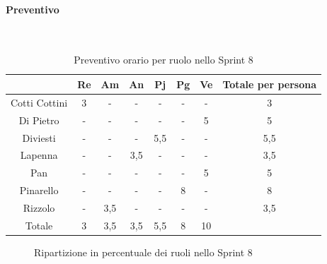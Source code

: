 \documentclass{article}
\begin{document}
                \paragraph{Preventivo}\mbox{}\\
                \begin{table}[H]
                    \centering
                    \begin{tabular}{|c|c|c|c|c|c|c|c|}
                    \hline
                                  & Re  & Am  & An  & Pj  & Pg  & Ve  & Totale per persona \\ \hline
                    Cotti Cottini & 3   & -   & -   & -   & -   & -   & 3                  \\ \hline
                    Di Pietro     & -   & -   & -   & -   & -   & 5   & 5                  \\ \hline
                    Diviesti      & -   & -   & -   & 5,5 & -   & -   & 5,5                \\ \hline
                    Lapenna       & -   & -   & 3,5 & -   & -   & -   & 3,5                \\ \hline
                    Pan           & -   & -   & -   & -   & -   & 5   & 5                  \\ \hline
                    Pinarello     & -   & -   & -   & -   & 8  & -   & 8                 \\ \hline
                    Rizzolo       & -   & 3,5 & -   & -   & -   & -   & 3,5                \\ \hline
                    Totale        & 3   & 3,5 & 3,5 & 5,5 & 8  & 10  &                    \\ \hline
                    \end{tabular}
                    \caption{Preventivo orario per ruolo nello Sprint 8}
                \end{table}
                

                \begin{figure}[H]
                    \centering
                    \caption{Ripartizione in percentuale dei ruoli nello Sprint 8}
                \end{figure}
\end{document}
